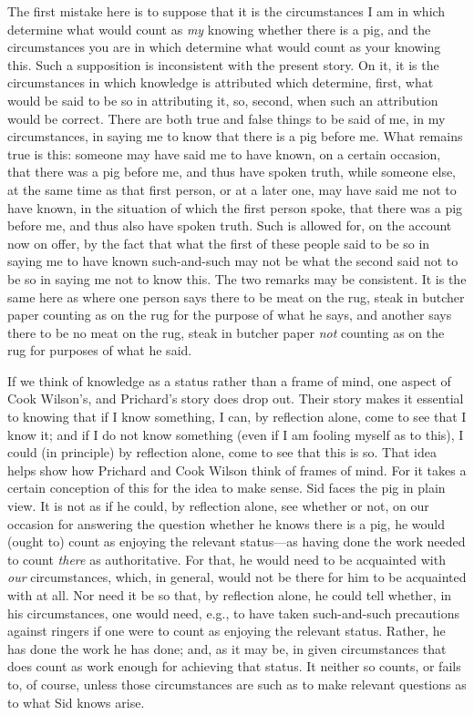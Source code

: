 The first mistake here is to suppose that it is the circumstances I am in which determine what would count as \emph{my} knowing whether there is a pig, and the circumstances you are in which determine what would count as your knowing this. Such a supposition is inconsistent with the present story. On it, it is the circumstances in which knowledge is attributed which determine, first, what would be said to be so in attributing it, so, second, when such an attribution would be correct. There are both true and false things to be said of me, in my circumstances, in saying me to know that there is a pig before me. What remains true is this: someone may have said me to have known, on a certain occasion, that there was a pig before me, and thus have spoken truth, while someone else, at the same time as that first person, or at a later one, may have said me not to have known, in the situation of which the first person spoke, that there was a pig before me, and thus also have spoken truth. Such is allowed for, on the account now on offer, by the fact that what the first of these people said to be so in saying me to have known such-and-such may not be what the second said not to be so in saying me not to know this. The two remarks may be consistent. It is the same here as where one person says there to be meat on the rug, steak in butcher paper counting as on the rug for the purpose of what he says, and another says there to be no meat on the rug, steak in butcher paper \emph{not} counting as on the rug for purposes of what he said.

If we think of knowledge as a status rather than a frame of mind, one aspect of Cook Wilson’s, and Prichard’s story does drop out. Their story makes it essential to knowing that if I know something, I can, by reflection alone, come to see that I know it; and if I do not know something (even if I am fooling myself as to this), I could (in principle) by reflection alone, come to see that this is so. That idea helps show how Prichard and Cook Wilson think of frames of mind. For it takes a certain conception of this for the idea to make sense. Sid faces the pig in plain view. It is not as if he could, by reflection alone, see whether or not, on our occasion for answering the question whether he knows there is a pig, he would (ought to) count as enjoying the relevant status---as having done the work needed to count \emph{there} as authoritative. For that, he would need to be acquainted with \emph{our} circumstances, which, in general, would not be there for him to be acquainted with at all. Nor need it be so that, by reflection alone, he could tell whether, in his circumstances, one would need, e.g., to have taken such-and-such precautions against ringers if one were to count as enjoying the relevant status. Rather, he has done the work he has done; and, as it may be, in given circumstances that does count as work enough for achieving that status. It neither so counts, or fails to, of course, unless those circumstances are such as to make relevant questions as to what Sid knows arise.

